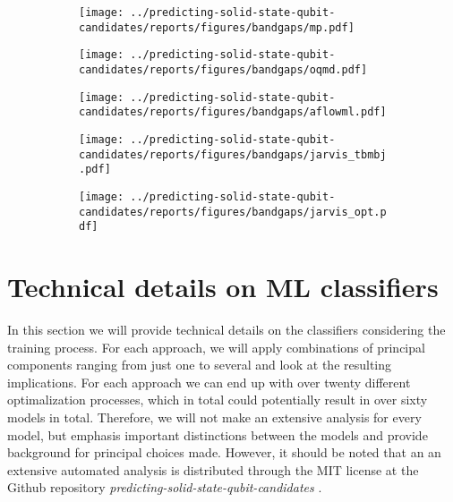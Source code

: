 \clearpage
\begin{figure}[ht!]
    \centering
    \begin{subfigure}[t]{1\textwidth}
        \centering
        \texttt{[image: ../predicting-solid-state-qubit-candidates/reports/figures/bandgaps/mp.pdf]}
        \caption{}
    \end{subfigure}%

    \begin{subfigure}[t]{1\textwidth}
        \centering
        \texttt{[image: ../predicting-solid-state-qubit-candidates/reports/figures/bandgaps/oqmd.pdf]}
        \caption{}
    \end{subfigure}

    \begin{subfigure}[t]{1\textwidth}
        \centering
        \texttt{[image: ../predicting-solid-state-qubit-candidates/reports/figures/bandgaps/aflowml.pdf]}
        \caption{}
    \end{subfigure}
\end{figure}

\begin{figure}[t!]\ContinuedFloat
    \centering
    \begin{subfigure}[t]{1\textwidth}
        \centering
        \texttt{[image: ../predicting-solid-state-qubit-candidates/reports/figures/bandgaps/jarvis\_tbmbj.pdf]}
        \caption{}
    \end{subfigure}%

    \begin{subfigure}[t]{1\textwidth}
        \centering
        \texttt{[image: ../predicting-solid-state-qubit-candidates/reports/figures/bandgaps/jarvis\_opt.pdf]}
        \caption{}
    \end{subfigure}
    \vspace*{-95mm}
    \caption{}
\end{figure}

\clearpage

\section{Technical details on ML classifiers}

In this section we will provide technical details on the classifiers considering the training process. For each approach, we will apply combinations of principal components ranging from just one to several and look at the resulting implications. For each approach we can end up with over twenty different optimalization processes, which in total could potentially result in over sixty models in total. Therefore, we will not make an extensive analysis for every model, but emphasis important distinctions between the models and provide background for principal choices made. However, it should be noted that an an extensive automated analysis is distributed through the MIT license at the Github repository \textit{predicting-solid-state-qubit-candidates} \cite{Ohebbi2021}.

